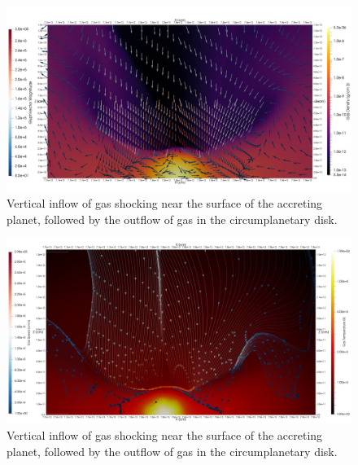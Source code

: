\documentclass[preprint2]{aastex62}
\begin{document}
\begin{figure}[h]
	\centering
	\includegraphics[width=\linewidth]{figures/Presentation/OutFlowCross.png}
	\caption{\label{fig:vel} Vertical inflow of gas shocking near the surface of the accreting planet, followed by the outflow of gas in the circumplanetary disk.}
\end{figure}
\begin{figure}
	\centering
	\includegraphics[width=\linewidth]{figures/Presentation/GasShock.png}
	\caption{\label{fig:tshock} Vertical inflow of gas shocking near the surface of the accreting planet, followed by the outflow of gas in the circumplanetary disk.}
\end{figure}

\end{document}
